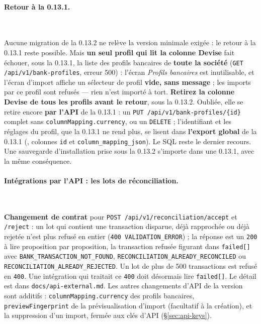 \documentclass[a4paper,11pt,oneside]{article}
\begin{document}
\paragraph{Retour à la 0.13.1.}\label{sec:maj-0-13-2-retour}\mbox{}\\
\begin{sloppypar}
Aucune migration de la 0.13.2 ne relève la version minimale exigée : le retour à la 0.13.1 reste possible. Mais \textbf{un seul profil qui lit la colonne Devise} fait échouer, sous la 0.13.1, la liste des profils bancaires de \textbf{toute la société} (\texttt{GET /api/v1/bank-profiles}, erreur 500) : l'écran \emph{Profils bancaires} est inutilisable, et l'écran d'import affiche un sélecteur de profil \textbf{vide, sans message} ; les imports par ce profil sont refusés --- rien n'est importé à tort. \textbf{Retirez la colonne Devise de tous les profils avant le retour}, sous la 0.13.2. Oubliée, elle se retire encore \textbf{par l'API} de la 0.13.1 : un \texttt{PUT /api/v1/bank-profiles/\{id\}} complet sans \texttt{columnMapping.currency}, ou un \texttt{DELETE} ; l'identifiant et les réglages du profil, que la 0.13.1 ne rend plus, se lisent dans \textbf{l'export global} de la 0.13.1 (, colonnes \texttt{id} et \texttt{column\_mapping\_json}). Le SQL reste le dernier recours. Une sauvegarde d'installation prise sous la 0.13.2 s'importe dans une 0.13.1, avec la même conséquence.
\end{sloppypar}

\paragraph{Intégrations par l'API : les lots de réconciliation.}\mbox{}\\
\begin{sloppypar}
\textbf{Changement de contrat} pour \texttt{POST /api/v1/reconciliation/accept} et \texttt{/reject} : un lot qui contient une transaction disparue, déjà rapprochée ou déjà rejetée n'est plus refusé en entier (\texttt{400 VALIDATION\_ERROR}) ; la réponse est un \texttt{200} à lire proposition par proposition, la transaction refusée figurant dans \texttt{failed[]} avec \texttt{BANK\_TRANSACTION\_NOT\_FOUND}, \texttt{RECONCILIATION\_ALREADY\_RECONCILED} ou \texttt{RECONCILIATION\_ALREADY\_REJECTED}. Un lot de plus de 500 transactions est refusé en \texttt{400}. Une intégration qui traitait ce \texttt{400} doit désormais lire \texttt{failed[]}. Le détail est dans \texttt{docs/api-external.md}. Les autres changements d'API de la version sont additifs : \texttt{columnMapping.currency} des profils bancaires, \texttt{previewFingerprint} de la prévisualisation d'import (facultatif à la création), et la suppression d'un import, fermée aux clés d'API (\S\ref{sec:api-keys}).
\end{sloppypar}
\end{document}

